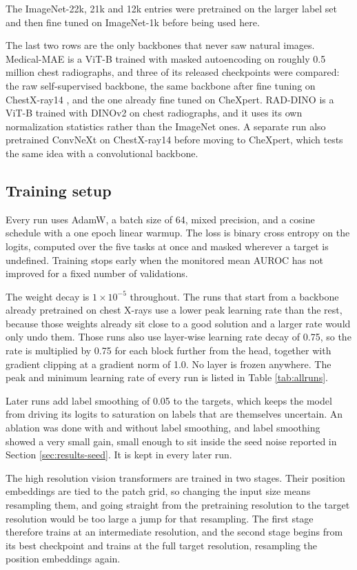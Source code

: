 \documentclass{article}
\begin{document}
The ImageNet-22k, 21k and 12k entries were pretrained on the larger label set and
then fine tuned on ImageNet-1k before being used here.

The last two rows are the only backbones that never saw natural images. Medical-MAE
is a ViT-B trained with masked autoencoding \cite{he2022mae} on roughly 0.5 million
chest radiographs, and three of its released checkpoints were compared: the raw
self-supervised backbone, the same backbone after fine tuning on ChestX-ray14
\cite{wang2017chestxray14}, and the one already fine tuned on CheXpert. RAD-DINO
\cite{perezgarcia2024raddino} is a ViT-B trained with DINOv2 \cite{oquab2024dinov2}
on chest radiographs, and it uses its own normalization statistics rather than the
ImageNet ones. A separate run also pretrained ConvNeXt on ChestX-ray14 before moving
to CheXpert, which tests the same idea with a convolutional backbone.

\subsection{Training setup}

Every run uses AdamW, a batch size of 64, mixed precision, and a cosine schedule with
a one epoch linear warmup. The
loss is binary cross entropy on the logits, computed over the five tasks at once and
masked wherever a target is undefined. Training stops early when the monitored mean
AUROC has not improved for a fixed number of validations.

The weight decay is $1\times10^{-5}$ throughout. The runs that start from a backbone
already pretrained on chest X-rays use a lower peak learning rate than the rest,
because those weights already sit close to a good solution and a larger rate would
only undo them. Those runs also use layer-wise learning rate decay of 0.75, so the
rate is multiplied by 0.75 for each block further from the head, together with gradient
clipping at a gradient norm of 1.0. No layer is frozen anywhere. The peak and minimum learning
rate of every run is listed in
Table \ref{tab:allruns}.

Later runs add label smoothing of 0.05 to the targets, which keeps the model from
driving its logits to saturation on labels that are themselves uncertain. An ablation
was done with and without label smoothing, and label smoothing showed a very small
gain, small enough to sit inside the seed noise reported in
Section \ref{sec:results-seed}. It is kept in every later run.

The high resolution vision transformers are trained in two stages. Their position
embeddings are tied to the patch grid, so changing the input size means resampling
them, and going straight from the pretraining resolution to the target resolution
would be too large a jump for that resampling. The first stage therefore trains at an
intermediate resolution, and the second stage begins from its best checkpoint and
trains at the full target resolution, resampling the position embeddings again.
\end{document}
